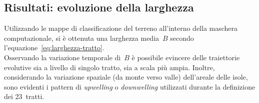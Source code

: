 \subsection{Risultati: evoluzione della larghezza}
Utilizzando le mappe di classificazione del terreno all'interno della maschera computazionale, si è ottenuta una larghezza media~$B$ secondo l'equazione~\eqref{eq:larghezza-tratto}.
\\
Osservando la variazione temporale di~$B$ è possibile evincere delle traiettorie evolutive sia a livello di singolo tratto, sia a scala più ampia.
Inoltre, considerando la variazione spaziale (da monte verso valle) dell'areale delle isole, sono evidenti i pattern di \emph{upwelling} o \emph{downwelling} utilizzati durante la definizione dei 23~tratti.

